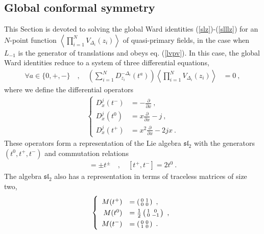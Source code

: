 \documentclass[12pt,a4paper,notitlepage]{report}
\newcommand \la {\left\langle}
\newcommand \ra {\right\rangle}
\newcommand \p {\partial}
\newcommand \pp[1] {{\frac{\p}{\p #1}}}
\numberwithin{equation}{section}
\theoremstyle{break}
\begin{document}
\subsection{Global conformal symmetry \label{secgcs}}

This Section is devoted to solving the global Ward identities (\ref{slz})-(\ref{slllz}) for an $N$-point function $\la \prod_{i=1}^N V_{\Delta_i}(z_i)\ra$ of quasi-primary fields, in the case when $L_{-1}$ is the generator of translations and obeys eq. (\ref{lvpv}). 
In this case, the global Ward identities reduce to a system of three differential equations, 
\begin{align}
\forall a \in \{0,+,-\}\quad , \quad 
 \left(\sum_{i=1}^N D_{z_i}^{-\Delta_i}(t^a)\right) \la \prod_{i=1}^N V_{\Delta_i}(z_i)\ra & = 0\ ,
\label{spz}
\end{align}
where we define the differential operators
\begin{align}
 \left\{ \begin{array}{rl} D_x^{j}(t^-) & = -\pp{x}\ ,
\\
D_x^{j}(t^0) &  = x\pp{x} -j\ ,
\\
D_x^{j}(t^+) & = x^2\pp{x} - 2j x \ .
\end{array}\right. 
\label{ddz}
\end{align}
These operators form a representation of the Lie algebra \textbf{\boldmath $\mathfrak{sl}_2$}  with the generators $(t^0,t^+,t^-)$ and commutation relations 
\begin{align}
 [t^0,t^\pm ] =\pm t^\pm \quad , \quad [t^+,t^-]=2t^0\ .
\label{ttpm}
\end{align}
The algebra $\mathfrak{sl}_2$ also has a representation in terms of traceless matrices of size two,
\begin{align}
\renewcommand{\arraystretch}{1.3}
\left\{ \begin{array}{rl}
 M(t^+)& = \left(\begin{smallmatrix} 0 & 1 \\ 0& 0 \end{smallmatrix} \right) \ , 
\\
 M(t^0) &= \frac12\left(\begin{smallmatrix} 1 & 0 \\ 0 & -1 \end{smallmatrix}\right)\ ,
\\
M(t^-) & = \left(\begin{smallmatrix} 0 & 0 \\ 1 & 0 \end{smallmatrix} \right) \ .
\end{array} \right.
\label{mta}
\end{align}
\end{document}
